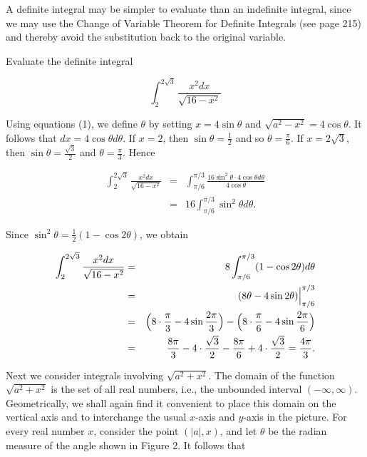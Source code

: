 A definite integral may be simpler to evaluate than an indefinite integral, since we may use the Change of Variable Theorem for Definite Integrals (see page 215) and thereby avoid the substitution back to the original variable.

\begin{example}
Evaluate the definite integral 

$$  
\int^{2\sqrt3}_{2} \frac{x^{2} dx}{\sqrt{16 - x^2}}
$$

\noindent Using equations (1), we define $\theta$ by setting $x = 4 \sin \theta$ and $\sqrt{a^{2} - x^{2}} = 4 \cos \theta$. It follows
that $dx = 4 \cos \theta d\theta$. If $x = 2$, then $\sin \theta = \frac{1}{2}$ and so
$\theta = \frac{\pi}{6}$. If $x = 2\sqrt3$, then $\sin \theta = \frac{\sqrt3}{2}$ and $\theta = \frac{\pi}{3}$. Hence


\begin{eqnarray*}
\int^{2\sqrt3}_{2} \frac{x^{2}dx}{\sqrt{16 - x^2}}
&=& \int^{\pi/3}_{\pi/6} \frac{16 \sin^{2}\theta \cdot 4\cos \theta d\theta}{4\cos \theta} \\
&=& 16 \int^{\pi/3}_{\pi/6} \sin^{2}\theta d\theta.  
\end{eqnarray*}

\noindent Since $\sin^{2} \theta = \frac{1}{2}(1 - \cos 2\theta)$, we obtain


\begin{eqnarray*}
\int^{2\sqrt3}_{2} \frac{x^{2} dx}{\sqrt{16 - x^2}}
&=& 8 \int^{\pi/3}_{\pi/6} (1- \cos 2\theta) d\theta \\
&=& (8\theta - 4 \sin 2\theta) \Big|^{\pi/3}_{\pi/6} \\
&=& \Bigl( 8 \cdot \frac{\pi}{3} - 4\sin \frac{2\pi}{3} \Bigr) - \Bigl( 8 \cdot \frac{\pi}{6} 
- 4 \sin \frac{2\pi}{6} \Bigr) \\
&=& \frac{8\pi}{3} - 4 \cdot \frac{\sqrt3}{2} - \frac{8\pi}{6} + 4 \cdot \frac{\sqrt3}{2} 
= \frac{4\pi}{3}.
\end{eqnarray*}
\end{example}

Next we consider integrals involving $\sqrt{a^2 + x^2}$. The domain of the function $\sqrt{a^2 + x^2}$ is the set of all real numbers, i.e., the unbounded interval $(-\infty, \infty)$. Geometrically, we shall again find it convenient to place this domain on the vertical axis and to interchange the usual $x$-axis and $y$-axis in the picture. For every real number $x$, consider the point $(|a|, x)$, and let $\theta$ be the radian measure of the angle shown in Figure 2. It follows that


